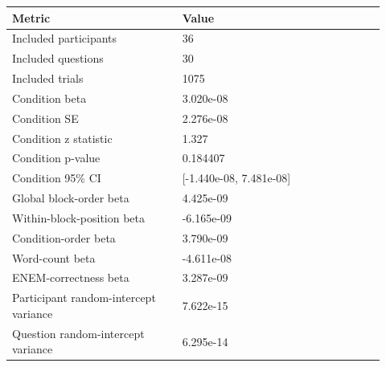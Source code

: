 \begin{tabular}{p{0.42\linewidth}p{0.50\linewidth}}
\toprule
Metric & Value\\
\midrule
Included participants & 36\\
Included questions & 30\\
Included trials & 1075\\
Condition beta & 3.020e-08\\
Condition SE & 2.276e-08\\
Condition z statistic & 1.327\\
Condition p-value & 0.184407\\
Condition 95\% CI & [-1.440e-08, 7.481e-08]\\
Global block-order beta & 4.425e-09\\
Within-block-position beta & -6.165e-09\\
Condition-order beta & 3.790e-09\\
Word-count beta & -4.611e-08\\
ENEM-correctness beta & 3.287e-09\\
Participant random-intercept variance & 7.622e-15\\
Question random-intercept variance & 6.295e-14\\
\bottomrule
\end{tabular}
